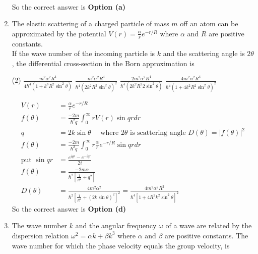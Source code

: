 \begin{enumerate}
\begin{answer}
\begin{align*}
	\end{align*}
		So the correct answer is \textbf{Option (a)}
\end{answer}
\item  The elastic scattering of a charged particle of mass $m$ off an atom can be approximated by the potential $V(r)=\frac{\alpha}{r} e^{-r / R}$ where $\alpha$ and $R$ are positive constants.\\
If the wave number of the incoming particle is $k$ and the scattering angle is $2 \theta$, the differential cross-section in the Born approximation is
 \begin{tasks}(2)
	\task[\textbf{a.}]$\frac{m^{2} \alpha^{2} R^{4}}{4 \hbar^{4}\left(1+k^{3} R^{2} \sin ^{2} \theta\right)}$
	\task[\textbf{b.}]$\frac{m^{2} \alpha^{2} R^{4}}{\hbar^{4}\left(2 k^{2} R^{2} \sin ^{2} \theta\right)^{2}}$
	\task[\textbf{c.}] $\frac{2 m^{2} \alpha^{2} R^{4}}{\hbar^{4}\left(2 k^{2} R^{2} 2 \sin ^{2} \theta\right)}$
	\task[\textbf{d.}] $\frac{4 m^{2} \alpha^{2} R^{4}}{\hbar^{4}\left(1+4 k^{2} R^{2} \sin ^{2} \theta\right)^{2}}$
\end{tasks}
\begin{answer}
	\begin{align*}
	V(r)&=\frac{\alpha}{r} e^{-r / R}\\
	f(\theta)&=\frac{-2 m}{\hbar^{2} q} \int_{0}^{\infty} r V(r) \sin q r d r\\
	q&=2 k \sin \theta \quad \text { where } 2 \theta \text { is scattering angle } D(\theta)=|f(\theta)|^{2}\\
	f(\theta)&=\frac{-2 m}{\hbar^{2} q} \int_{0}^{\infty} r \frac{\alpha}{r} e^{-r / R} \sin q r d r\\
	\text{put }\sin q r&=\frac{e^{i q r}-e^{-i q r}}{2 i}\\
	f(\theta)&=\frac{-2 m \alpha}{\hbar^{2}\left[\frac{1}{R^{2}}+q^{2}\right]}\\
	D(\theta)&=\frac{4 m^{2} \alpha^{2}}{\hbar^{2}\left[\frac{1}{R^{2}}+(2 k \sin \theta)^{2}\right]^{2}}=\frac{4 m^{2} \alpha^{2} R^{2}}{\hbar^{4}\left[1+4 R^{2} k^{2} \sin ^{2} \theta\right]^{2}}
	\end{align*}
		So the correct answer is \textbf{Option (d)}
\end{answer}
\item  The wave number $k$ and the angular frequency $\omega$ of a wave are related by the dispersion relation $\omega^{2}=\alpha k+\beta k^{3}$ where $\alpha$ and $\beta$ are positive constants. The wave number for which the phase velocity equals the group velocity, is

\end{enumerate}
